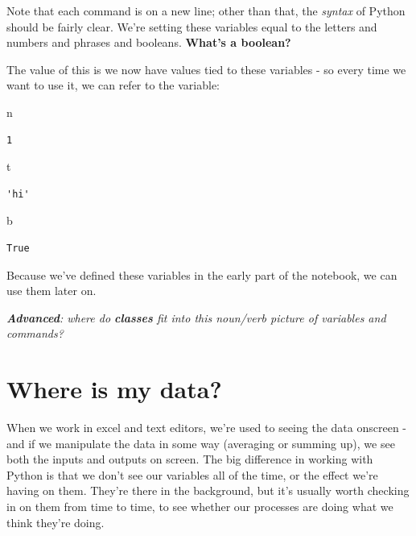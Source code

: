 \documentclass[
  letterpaper,
  DIV=11,
  numbers=noendperiod]{scrreprt}
\newenvironment{Shaded}{\begin{snugshade}}{\end{snugshade}}
\newcommand{\NormalTok}[1]{\textcolor[rgb]{0.00,0.23,0.31}{#1}}
\begin{document}
Note that each command is on a new line; other than that, the
\emph{syntax} of Python should be fairly clear. We're setting these
variables equal to the letters and numbers and phrases and booleans.
\textbf{What's a boolean?}

The value of this is we now have values tied to these variables - so
every time we want to use it, we can refer to the variable:

\begin{Shaded}
\begin{Highlighting}[]
\NormalTok{n}
\end{Highlighting}
\end{Shaded}

\begin{verbatim}
1
\end{verbatim}

\begin{Shaded}
\begin{Highlighting}[]
\NormalTok{t}
\end{Highlighting}
\end{Shaded}

\begin{verbatim}
'hi'
\end{verbatim}

\begin{Shaded}
\begin{Highlighting}[]
\NormalTok{b}
\end{Highlighting}
\end{Shaded}

\begin{verbatim}
True
\end{verbatim}

Because we've defined these variables in the early part of the notebook,
we can use them later on.

\emph{\textbf{Advanced}: where do \textbf{classes} fit into this
noun/verb picture of variables and commands?}

\hypertarget{where-is-my-data}{%
\section{Where is my data?}\label{where-is-my-data}}

When we work in excel and text editors, we're used to seeing the data
onscreen - and if we manipulate the data in some way (averaging or
summing up), we see both the inputs and outputs on screen. The big
difference in working with Python is that we don't see our variables all
of the time, or the effect we're having on them. They're there in the
background, but it's usually worth checking in on them from time to
time, to see whether our processes are doing what we think they're
doing.
\end{document}
